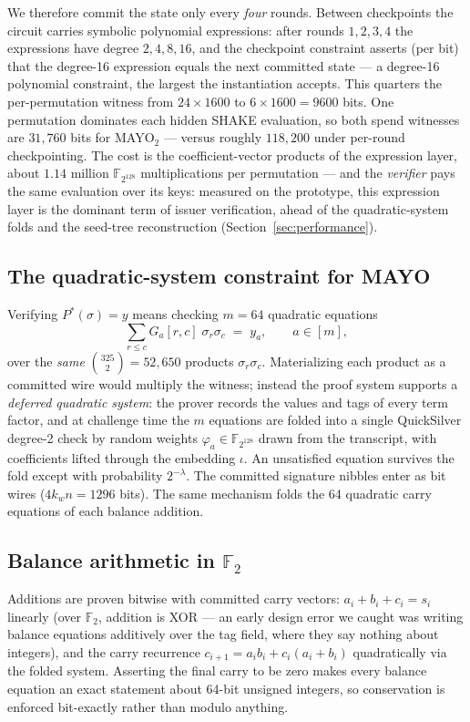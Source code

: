 \documentclass[11pt]{article}
\newcommand{\F}{\mathbb{F}}
\newcommand{\Ftwo}{\F_2}
\newcommand{\Ftag}{\F_{2^{128}}}
\begin{document}
We therefore commit the state only every \emph{four} rounds. Between
checkpoints the circuit carries symbolic polynomial expressions: after
rounds $1,2,3,4$ the expressions have degree $2,4,8,16$, and the checkpoint
constraint asserts (per bit) that the degree-16 expression equals the next
committed state --- a degree-16 polynomial constraint, the largest the
instantiation accepts. This quarters the per-permutation witness from
$24 \times 1600$ to $6 \times 1600 = 9600$ bits. One permutation dominates
each hidden SHAKE evaluation, so both spend witnesses are $31{,}760$ bits
for MAYO$_2$ --- versus roughly $118{,}200$ under per-round
checkpointing. The cost is
the coefficient-vector products of the expression layer, about
$1.14$ million $\Ftag$ multiplications per permutation --- and the
\emph{verifier} pays the same evaluation over its keys: measured on the
prototype, this expression layer is the dominant term of issuer
verification, ahead of the quadratic-system folds and the seed-tree
reconstruction (Section~\ref{sec:performance}).

\subsection{The quadratic-system constraint for MAYO}
\label{sec:quadsys}

Verifying $P^\ast(\sigma) = y$ means checking $m = 64$ quadratic equations
\[
\sum_{r \le c} G_a[r,c]\; \sigma_r \sigma_c \;=\; y_a,
\qquad a \in [m],
\]
over the \emph{same} $\binom{325}{2} = 52{,}650$ products
$\sigma_r \sigma_c$. Materializing each product as a committed wire would
multiply the witness; instead the proof system supports a \emph{deferred
quadratic system}: the prover records the values and tags of every term
factor, and at challenge time the $m$ equations are folded into a single
QuickSilver degree-2 check by random weights $\varphi_a \in \Ftag$ drawn
from the transcript, with coefficients lifted through the embedding $\iota$.
An unsatisfied equation survives the fold except with probability
$2^{-\lambda}$. The committed signature nibbles enter as bit wires
($4 k_w n = 1296$ bits). The same mechanism folds the 64 quadratic carry
equations of each balance addition.

\subsection{Balance arithmetic in \texorpdfstring{$\Ftwo$}{GF(2)}}

Additions are proven bitwise with committed carry vectors:
$a_i + b_i + c_i = s_i$ linearly (over $\Ftwo$, addition is XOR --- an early
design error we caught was writing balance equations additively over the tag
field, where they say nothing about integers), and the carry recurrence
$c_{i+1} = a_i b_i + c_i(a_i + b_i)$ quadratically via the folded system.
Asserting the final carry to be zero makes every balance equation an exact
statement about 64-bit unsigned integers, so conservation is enforced
bit-exactly rather than modulo anything.
\end{document}
